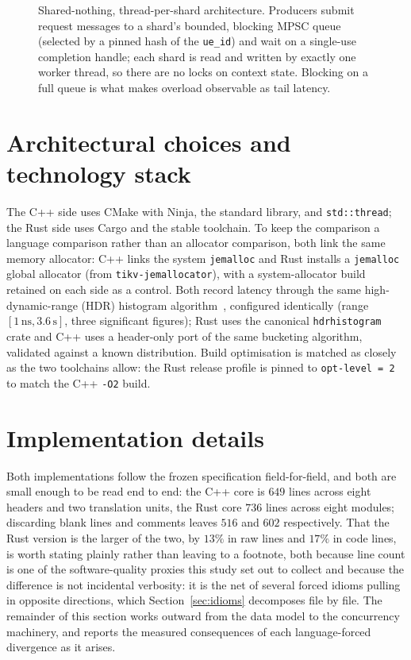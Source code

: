 \documentclass[english,twoside,openright,a4paper,censored,csm,software-track-2020]{HYthesisML}
\begin{document}
\begin{figure}
\caption{Shared-nothing, thread-per-shard architecture. Producers submit request messages to a
shard's bounded, blocking MPSC queue (selected by a pinned hash of the \texttt{ue\_id}) and wait
on a single-use completion handle; each shard is read and written by exactly one worker thread,
so there are no locks on context state. Blocking on a full queue is what makes overload
observable as tail latency.\label{fig:arch}}
\end{figure}

\section{Architectural choices and technology stack}
The C++ side uses CMake with Ninja, the standard library, and \texttt{std::thread}; the Rust
side uses Cargo and the stable toolchain. To keep the comparison a language comparison
rather than an allocator comparison, both link the same memory allocator: C++ links the
system \texttt{jemalloc} and Rust installs a \texttt{jemalloc} global allocator (from
\texttt{tikv-jemallocator}), with a system-allocator build retained on each side as a
control. Both record latency through the same high-dynamic-range (HDR) histogram
algorithm~\cite{tene_hdrhistogram}, configured identically (range $[1\,\text{ns},
3.6\,\text{s}]$, three significant figures); Rust uses the canonical \texttt{hdrhistogram}
crate and C++ uses a header-only port of the same bucketing algorithm, validated against a
known distribution. Build optimisation is matched as closely as the two toolchains allow:
the Rust release profile is pinned to \texttt{opt-level~=~2} to match the C++ \texttt{-O2}
build.

\section{Implementation details}\label{sec:impldetails}
\label{sec:impl}
Both implementations follow the frozen specification field-for-field, and both are small
enough to be read end to end: the C++ core is $649$ lines across eight headers and two
translation units, the Rust core $736$ lines across eight modules; discarding blank lines and
comments leaves $516$ and $602$ respectively. That the Rust version is the larger of the two,
by $13\%$ in raw lines and $17\%$ in code lines, is worth stating plainly rather than leaving
to a footnote, both because line count is one of the software-quality proxies this study set
out to collect and because the difference is not incidental verbosity: it is the net of
several forced idioms pulling in opposite directions, which Section~\ref{sec:idioms}
decomposes file by file. The remainder of this section works outward from the data model to
the concurrency machinery, and reports the measured consequences of each language-forced
divergence as it arises.
\end{document}
